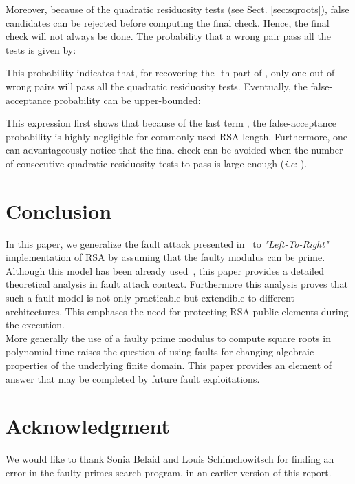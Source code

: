 \documentclass{article}
\begin{document}
Moreover, because of the quadratic residuosity tests (see Sect. \ref{sec:sqroots}), false candidates can be rejected before computing the final check. Hence, the final check will not always be done. The probability that a wrong pair pass all the  tests is given by:

This probability indicates that, for recovering the -th part of , only one out of  wrong pairs will pass all the quadratic residuosity tests. Eventually, the false-acceptance probability can be upper-bounded:

This expression first shows that because of the last term , the false-acceptance probability is highly negligible for commonly used RSA length. Furthermore, 
one can advantageously notice that the final check can be avoided when the number of consecutive quadratic residuosity tests to pass is large enough (\textit{i.e}: ).

\section{Conclusion}
In this paper, we generalize the fault attack presented in~\cite{77} to \textit{"Left-To-Right"} implementation of RSA by assuming that the faulty modulus can be prime. Although this model has been already used~\cite{67}, this  paper provides a detailed theoretical analysis in fault attack context. Furthermore this analysis proves that such a fault model is not only practicable but extendible to different architectures. This emphases the need for protecting RSA public elements during the execution.\\
\indent
More generally the use of a faulty prime modulus to compute square
roots in polynomial time raises the question of using faults for
changing algebraic properties of the underlying finite domain. 
This paper provides an element of answer that may be completed by
future fault exploitations.

\section*{Acknowledgment}
We would like to thank Sonia Belaid and Louis Schimchowitsch for
finding an error in the faulty primes search program, in an earlier
version of this report.


\end{document}
